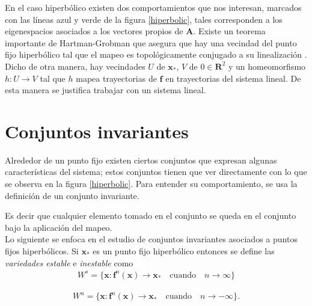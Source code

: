 En el caso hiperbólico existen dos comportamientos que nos interesan, marcados con las líneas azul y verde de la figura \ref{hiperbolic}, tales corresponden a los eigenespacios asociados a los vectores propios de $\mathbf{A}$. Existe un teorema importante de Hart\-man-Grob\-man que asegura que hay una vecindad del punto fijo hiperbólico tal que el mapeo es topológicamente conjugado a su linealización \cite{Meiss,Meyer,Juergen}. Dicho de otra manera, hay vecindades $U$ de $\mathbf{x}_{*}$, $V$ de $0 \in \mathbf{R}^{2}$ y un homeomorfismo $h:U\rightarrow V$ tal que $h$ mapea trayectorias de $\mathbf{f}$ en trayectorias del sistema lineal. De esta manera se justifica trabajar con un sistema lineal.



\section{Conjuntos invariantes}
Alrededor de un punto fijo existen ciertos conjuntos que expresan algunas ca\-rac\-te\-rís\-ti\-cas del sistema; estos conjuntos tienen que ver directamente con lo que se observa en la figura \ref{hiperbolic}. Para entender su comportamiento, se usa la definición de un conjunto invariante.

Es decir que cualquier elemento tomado en el conjunto se queda en el conjunto bajo la aplicación del mapeo. \\

Lo siguiente se enfoca en el estudio de conjuntos invariantes asociados a puntos fijos hiperbólicos. Si $\mathbf{x}_{*}$ es un punto fijo hiperbólico entonces se define las \textit{variedades estable} e \textit{inestable} como
\begin{eqnarray}
W^{s}=\lbrace \mathbf{x} : \mathbf{f}^{n}(\mathbf{x})\rightarrow \mathbf{x}_{*} \quad \mathrm{cuando} \quad n\rightarrow \infty \rbrace
\label{variedad estable}
\end{eqnarray}

\begin{eqnarray}
W^{u}=\lbrace \mathbf{x} : \mathbf{f}^{n}(\mathbf{x})\rightarrow \mathbf{x}_{*} \quad \mathrm{cuando} \quad n\rightarrow -\infty \rbrace.
\label{variedad inestable}
\end{eqnarray}


